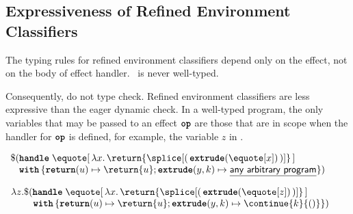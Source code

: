 
\subsection{Expressiveness of Refined Environment Classifiers}\label{subsection:rec-formal-expressiveness}
The typing rules for refined environment classifiers depend only on the effect, not on the body of effect handler.\  is never well-typed.

Consequently,  do not type check. Refined environment classifiers are less expressive than the eager dynamic check. In a well-typed \recLang{} program, the only variables that may be passed to an effect $\textbf{\texttt{op}}$ are those that are in scope when the handler for $\textbf{\texttt{op}}$ is defined, for example, the variable $z$ in .

\begin{code}
\begin{rec}
$\begin{array}{l}
  \$ (\textbf{\texttt{handle}} \; \equote[\, {\lambda x. \, \return{\splice[(\, {{\textbf{\texttt{extrude}}(\equote[x])}} \, )]}} \, ] \\
  \;\;\,\, \textbf{\texttt{with}} \, \{ \textbf{\texttt{return}}(u) \mapsto {\return{u}}; \textbf{\texttt{extrude}}(y, k) \mapsto {\underline{\textsf{any arbitrary program}}}\})
\end{array}$
\end{rec}
%
\label{listing:refined-environment-classifiers-expressiveness}
\end{code}

\begin{code}
\begin{rec}
$\begin{array}{l}
  \lambda z. \$(\textbf{\texttt{handle}} \; \equote[\, {\lambda x. \, \return{\splice[( \, {{\textbf{\texttt{extrude}}(\equote[z])}} \, )]}} \,] \\
  \quad \quad \,\, \textbf{\texttt{with}} \, \{ \textbf{\texttt{return}}(u) \mapsto {\return{u}}; \textbf{\texttt{extrude}}(y, k) \mapsto {\continue{k}{()}}\})
\end{array}$
\end{rec}
%
\label{listing:refined-environment-classifiers-safe}
\end{code}

